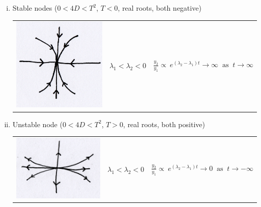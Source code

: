 \documentclass{article}
\begin{document}
\begin{enumerate}[(i)]
\item Stable nodes ($0< 4D < T^2$, $T<0$, real roots, both negative)
\\
\begin{tabular}{ m{3.5cm} m{2cm} m{6cm}} 
\includegraphics[scale = 0.15]{fig6.png}  & 
$ \lambda_1 < \lambda_2 < 0 $ & $ \frac{y_2}{y_1} \propto \
e^{(\lambda_2-\lambda_1)t} \to \infty \;\; \mbox{as} \;\; t \to \infty $
\end{tabular}

\item Unstable node ($0 < 4D < T^2$, $T>0$, real roots, both positive)
\\
\begin{tabular}{ m{4.5cm} m{2cm} m{6cm}} 
\includegraphics[scale = 0.15]{fig7.png}  & 
$ \lambda_1 < \lambda_2 < 0 $ & $ \frac{y_2}{y_1} \propto \
e^{(\lambda_2-\lambda_1)t} \to 0 \;\; \mbox{as} \;\; t \to -\infty $
\end{tabular}


\end{enumerate}
\end{document}
